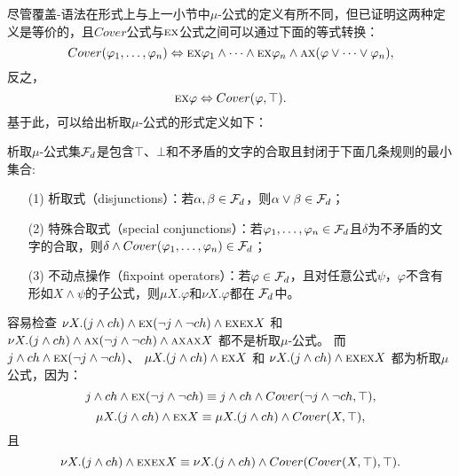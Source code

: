 尽管覆盖-语法在形式上与上一小节中$\mu$-公式的定义有所不同，但已证明这两种定义是等价的\cite{d2006modal}，且$Cover$公式与$\textsc{e}\textsc{x}$公式之间可以通过下面的等式转换：
\[
Cover(\varphi_1, \dots, \varphi_n) \Leftrightarrow \textsc{e}\textsc{x} \varphi_1 \wedge \dots \wedge \textsc{e}\textsc{x} \varphi_n \wedge \textsc{a}\textsc{x}(\varphi \vee \dots \vee \varphi_n),
\]
反之，
\[
\textsc{e}\textsc{x} \varphi \Leftrightarrow Cover(\varphi, \top).
\]
基于此，可以给出析取$\mu$-公式的形式定义如下：
\begin{definition}
	析取$\mu$-公式集${\cal F}_d$是包含$\top$、$\bot$和不矛盾的文字的合取且封闭于下面几条规则的最小集合:
	\begin{itemize}
		\item[(1)] 析取式（disjunctions）：若$\alpha, \beta \in {\cal F}_d$，则$\alpha \vee \beta \in {\cal F}_d$；
		\item[(2)] 特殊合取式（special conjunctions）：若$\varphi_1, \dots, \varphi_n\in {\cal F}_d$且$\delta$为不矛盾的文字的合取，则$\delta \wedge Cover(\varphi_1, \dots, \varphi_n) \in {\cal F}_d$；
		\item[(3)] 不动点操作（fixpoint operators）：若$\varphi\in  {\cal F}_d$，且对任意公式$\psi$，$\varphi$不含有形如$X \wedge \psi$的子公式，则$\mu X. \varphi$和$\nu X. \varphi$都在 ${\cal F}_d$中。
	\end{itemize}	
\end{definition}

\begin{example}\label{exmp:disF}
	容易检查 $\nu X. (j \wedge ch) \wedge \textsc{e}\textsc{x} (\neg j \wedge \neg ch) \wedge \textsc{e}\textsc{x} \textsc{e}\textsc{x} X$ 和  $\nu X. (j \wedge ch) \wedge \textsc{a}\textsc{x} (\neg j \wedge \neg ch) \wedge \textsc{a}\textsc{x} \textsc{a}\textsc{x} X$ 都不是析取$\mu$-公式。
	而 $j \wedge ch \wedge \textsc{e}\textsc{x} (\neg j \wedge \neg ch)$、 $\mu X. (j \wedge ch) \wedge \textsc{e}\textsc{x} X$ 和 $\nu X. (j \wedge ch) \wedge \textsc{e}\textsc{x} \textsc{e}\textsc{x} X$ 都为析取$\mu$公式，因为：
	\[
	j \wedge ch \wedge \textsc{e}\textsc{x} (\neg j \wedge \neg ch) \equiv j \wedge ch \wedge Cover(\neg j \wedge \neg ch, \top),
	\]
	\[
	\mu X. (j \wedge ch) \wedge \textsc{e}\textsc{x} X \equiv  \mu X. (j \wedge ch) \wedge Cover(X, \top),
	\] 且
	\[
	\nu X. (j \wedge ch) \wedge \textsc{e}\textsc{x} \textsc{e}\textsc{x} X \equiv \nu X. (j \wedge ch) \wedge Cover(Cover(X, \top), \top).
	\]
	
\end{example}


